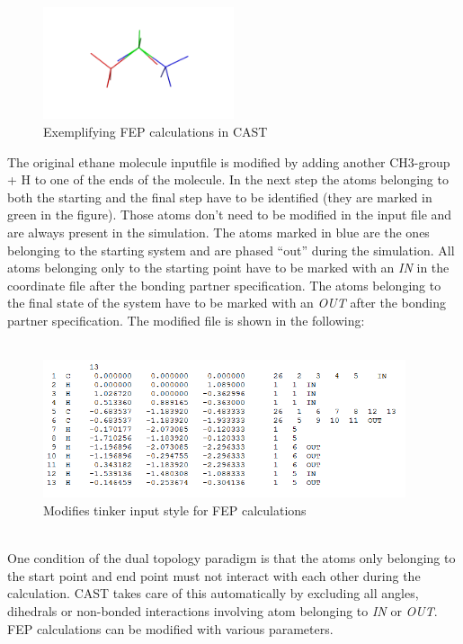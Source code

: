 \documentclass[10pt,a4paper]{article} %
\begin{document}
	\begin{figure}[h]
		\centering
		\includegraphics[width=0.5\textwidth]{img/imgfep1.png}
		\caption{Exemplifying \ac{FEP} calculations in \ac{CAST}}
		\label{fig:FEP1}
	\end{figure}
	The original ethane molecule inputfile is modified by adding another CH3-group + H to one of the ends of the molecule. In the next step the atoms belonging to both the starting and the final step have to be identified (they are marked in green in the figure). Those atoms don't need to be modified in the input file and are always present in the simulation. The atoms marked in blue are the ones belonging to the starting system and are phased ``out'' during the simulation. All atoms belonging only to the starting point have to be marked with an \textit{IN} in the coordinate file after the bonding partner specification. The atoms belonging to the final state of the system have to be marked with an \textit{OUT} after the bonding partner specification. The modified file is shown in the following:\\~\\
	\begin{figure}[h]
		\centering
		\includegraphics[width=0.95\textwidth]{img/imgfep2.png}
		\caption{Modifies tinker input style for \ac{FEP} calculations}
		\label{fig:FEP2}
	\end{figure}~\\
	One condition of the dual topology paradigm is that the atoms only belonging to the start point and end point must not interact with each other during the calculation. \ac{CAST} takes care of this automatically by excluding all angles, dihedrals or non-bonded interactions involving atom belonging to \textit{IN} or \textit{OUT}.
	\ac{FEP} calculations can be modified with various parameters.
\end{document}
